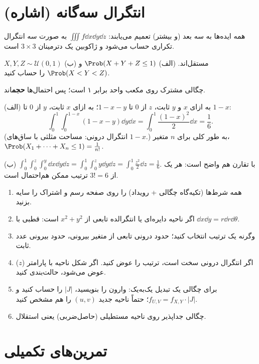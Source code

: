 \section{انتگرال سه‌گانه (اشاره)}
همه ایده‌ها به سه بعد (و بیشتر) تعمیم می‌یابند: $\iiint f\dd x\dd y\dd z$ به صورت سه انتگرال تکراری حساب می‌شود و ژاکوبین یک دترمینان $3\times3$ است.

\begin{example}
$X,Y,Z\sim\mathcal U(0,1)$ مستقل‌اند. (الف) $\Prob(X+Y+Z\le1)$ و (ب) $\Prob(X<Y<Z)$ را حساب کنید.
\begin{solution}
چگالی مشترک روی مکعب واحد برابر ۱ است؛ پس احتمال‌ها \textbf{حجم}اند.

(الف) به ازای $x$ و $y$ ثابت، $z$ از $0$ تا $1-x-y$؛ به ازای $x$ ثابت، $y$ از $0$ تا $1-x$:
\[
\int_0^1\!\!\int_0^{1-x}(1-x-y)\dd y\dd x=\int_0^1\frac{(1-x)^2}{2}\dd x=\frac16 .
\]
(انتگرال درونی: مساحت مثلثی با ساق‌های $1-x$.) به طور کلی برای $n$ متغیر، $\Prob(X_1+\cdots+X_n\le1)=\frac{1}{n!}$.

(ب) $\int_0^1\int_0^z\int_0^y\dd x\dd y\dd z=\int_0^1\int_0^zy\dd y\dd z=\int_0^1\frac{z^2}{2}\dd z=\frac16$. با تقارن هم واضح است: هر یک از $3!=6$ ترتیب ممکن هم‌احتمال است.
\end{solution}
\end{example}

\begin{summarybox}
\begin{enumerate}
\item همه شرط‌ها (تکیه‌گاه چگالی + رویداد) را روی صفحه رسم و اشتراک را سایه بزنید.
\item اگر ناحیه دایره‌ای یا انتگرالده تابعی از $x^2+y^2$ است: قطبی با $\dd x\dd y=r\dd r\dd\theta$.
\item وگرنه یک ترتیب انتخاب کنید؛ حدود درونی تابعی از متغیر بیرونی، حدود بیرونی عدد ثابت.
\item اگر انتگرال درونی سخت است، ترتیب را عوض کنید. اگر شکل ناحیه با پارامتر ($z$) عوض می‌شود، حالت‌بندی کنید.
\item برای چگالی یک تبدیل یک‌به‌یک: وارون را بنویسید، $|J|$ را حساب کنید و $f_{U,V}=f_{X,Y}\cdot|J|$؛ حتماً ناحیه جدید $(u,v)$ را هم مشخص کنید.
\item چگالی جداپذیر روی ناحیه مستطیلی (حاصل‌ضربی) یعنی استقلال.
\end{enumerate}
\end{summarybox}

\section{تمرین‌های تکمیلی}

